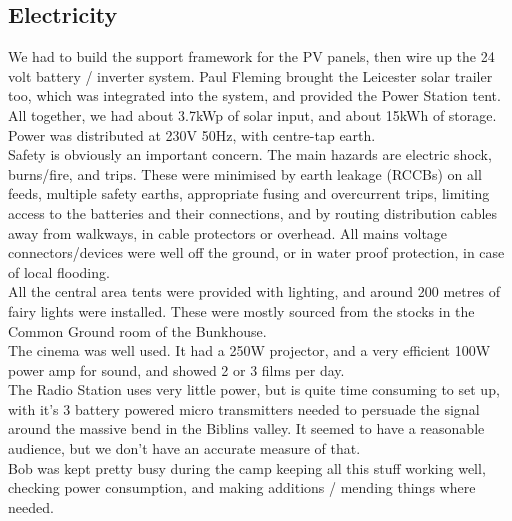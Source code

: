 \subsection{Electricity}
We had to build the support framework for the PV panels, then wire up the 24 volt battery / inverter system. Paul Fleming brought the Leicester solar trailer too, which was integrated into the system, and provided the Power Station tent. All together, we had about 3.7kWp of solar input, and about 15kWh of storage. Power was distributed at 230V 50Hz, with centre-tap earth.  \\


Safety  is obviously  an important concern. The main hazards are electric shock, burns/fire, and trips. These were minimised by earth leakage  (RCCBs) on all feeds, multiple safety earths, appropriate fusing and overcurrent trips, limiting access to the batteries and their connections, and by routing distribution cables away  from walkways,  in cable protectors or overhead. All mains voltage connectors/devices were well off the ground, or in water proof protection, in case of local flooding. \\


All the central area tents were provided with lighting, and around 200 metres of fairy lights were installed. These were mostly sourced from the stocks in the Common Ground room of the Bunkhouse.\\


The cinema was well used. It had a 250W projector, and a very efficient 100W power  amp for sound, and showed 2 or 3 films per day.\\


The Radio Station uses very little power, but is quite time consuming to set up, with it's 3 battery powered micro transmitters needed to persuade the signal around the massive bend in the Biblins valley.  It seemed to have a reasonable audience, but we don't  have an accurate measure of that.\\


Bob was kept pretty busy  during the camp keeping all this stuff working well, checking power consumption, and making additions / mending things where needed.
